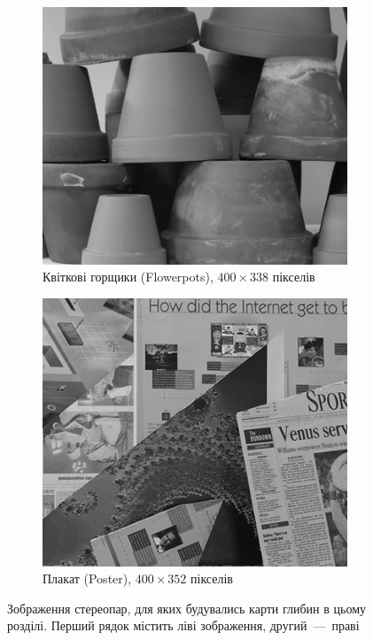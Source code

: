 \begin{figure}[h]
\begin{subfigure}[t]{0.32\textwidth}
    \end{subfigure}
    \hfill
    \begin{subfigure}[t]{0.32\textwidth}
        \centering
        \includegraphics[width=\textwidth]{images/pots_right}
        \caption{Квіткові горщики (Flowerpots), $400 \times 338$ пікселів}
    \end{subfigure}
    \hfill
    \begin{subfigure}[t]{0.32\textwidth}
        \centering
        \includegraphics[width=\textwidth]{images/poster_right}
        \caption{Плакат (Poster), $400 \times 352$ пікселів}
    \end{subfigure}
    \caption{Зображення стереопар,
             для яких будувались карти глибин в цьому розділі.
             Перший рядок містить ліві зображення, другий~---~праві}
    \label{fig:stereopair}
\end{figure}

